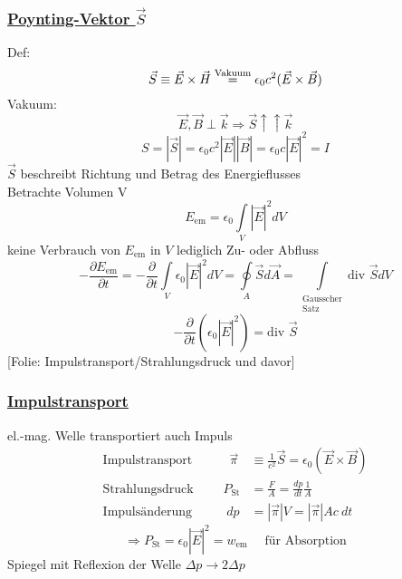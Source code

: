 \documentclass[titlepage,12pt,a4paper,ngerman]{report}
\newcommand{\tx}[1]{\textrm{#1}}
\newcommand{\folie}[1]{\color{gray}[Folie: #1]\color{black}}
\begin{document}
\subsubsection{\underline{Poynting-Vektor $ \vec{S} $}}
Def:
$$ \vec{S} \equiv \vec{E} \times \vec{H} \buildrel \tx{Vakuum} \over = \epsilon_0 c^2 (\vec{E} \times \vec{B}) $$
Vakuum:
$$\vec{E} , \vec{B} \perp \vec{k} \Rightarrow \vec{S} \uparrow\uparrow \vec{k}$$
$$S = |\vec{S}| = \epsilon_0 c^2 |\vec{E}| |\vec{B}| = \epsilon_0 c |\vec{E}|^2 = I$$
$ \vec{S} $ beschreibt Richtung und Betrag des Energieflusses\\
Betrachte Volumen V
$$E_{\tx{em}} = \epsilon_0 \int\limits_V |\vec{E}|^2 dV$$
keine Verbrauch von $ E_{\tx{em}} $ in $ V $ lediglich Zu- oder Abfluss
\begin{equation*}
- \frac{\partial E_{\tx{em}}}{\partial t} = - \frac{\partial }{\partial t} \int\limits_V \epsilon_0 |\vec{E}|^2 dV = \oint\limits_A \vec{S} d\vec{A} = \int\limits_{\substack{\tx{Gausscher}\\\tx{Satz}}} \tx{div } \vec{S} dV
\end{equation*}
\begin{equation*}
\boxed{-\frac{\partial}{\partial t} (\epsilon_0 |\vec{E}|^2) = \tx{div }\vec{S} } 
\end{equation*}
\folie{Impulstransport/Strahlungsdruck und davor}
\subsubsection{\underline{Impulstransport}}
el.-mag. Welle transportiert auch Impuls\\


\begin{align*}
\tx{Impulstransport }\qquad \ \ \,\vec{\pi} &\equiv \frac{1}{c^2} \vec{S} = \epsilon_0 (\vec{E} \times \vec{B})\\[5pt]
\tx{Strahlungsdruck }\qquad P_{\tx{St}} &= \frac{F}{A} = \frac{dp}{dt} \frac{1}{A}\\[5pt]
\tx{Impulsänderung }\qquad \ \, dp &= |\vec{\pi}| V = |\vec{\pi}| A c \ dt
\end{align*}
$$\Rightarrow P_{\tx{St}} = \epsilon_0 |\vec{E}|^2 = w_{\tx{em}} \quad \tx{ für Absorption}$$
Spiegel mit Reflexion der Welle $ \Delta p \rightarrow 2 \Delta p $
\end{document}

